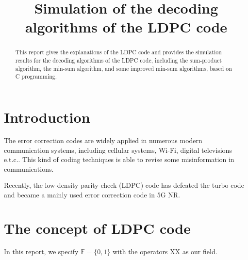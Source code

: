 \documentclass[conference]{IEEEtran}
\begin{document}
\title{Simulation of the decoding algorithms of the LDPC code}
\author{
}

\maketitle

\begin{abstract}
This report gives the explanations of the LDPC code and provides the
simulation results for the decoding algorithms of the LDPC code, 
including the sum-product algorithm, the min-sum algorithm, and some 
improved min-sum algorithms, based on C programming.

\end{abstract}

\section{Introduction}
The error correction codes are widely applied in numerous modern communication systems, 
including cellular systems, Wi-Fi, digital televisions e.t.c.. 
This kind of coding techniques is able to revise some misinformation in communications.

Recently, the low-density parity-check (LDPC) code has defeated the turbo code and 
became a mainly used error correction code in 5G NR.

\section{The concept of LDPC code}

In this report, we specify $\mathbb{F}=\{0,1\}$ with the operators XX as our field.
\end{document}
